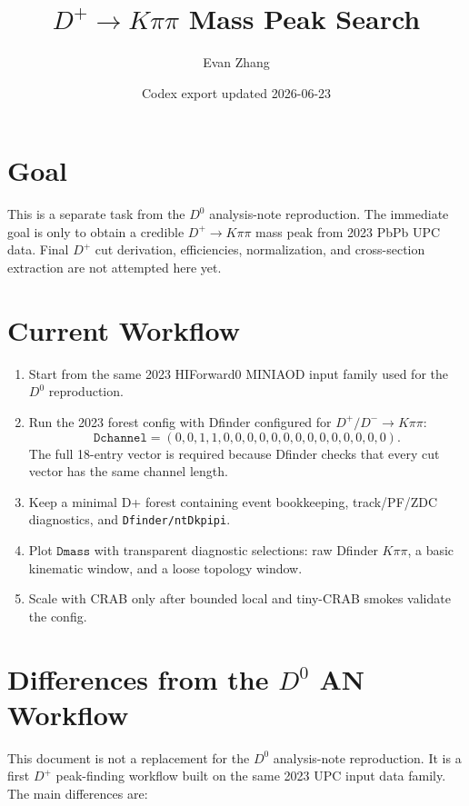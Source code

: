 \documentclass[10pt]{article}
\title{\texorpdfstring{\(D^+ \to K\pi\pi\) Mass Peak Search}{D+ to Kpipi Mass Peak Search}}
\author{Evan Zhang}
\date{Codex export updated 2026-06-23}
\begin{document}
\maketitle
\vspace{-1.2em}

\section*{Goal}

This is a separate task from the \(D^0\) analysis-note reproduction. The
immediate goal is only to obtain a credible \(D^+ \to K\pi\pi\) mass peak from
2023 PbPb UPC data. Final \(D^+\) cut derivation, efficiencies, normalization,
and cross-section extraction are not attempted here yet.

\section*{Current Workflow}

\begin{enumerate}
\item Start from the same 2023 HIForward0 MINIAOD input family used for the
\(D^0\) reproduction.
\item Run the 2023 forest config with Dfinder configured for
\(D^+/D^- \to K\pi\pi\):
\[
\texttt{Dchannel} =
(0,0,1,1,0,0,0,0,0,0,0,0,0,0,0,0,0,0).
\]
The full 18-entry vector is required because Dfinder checks that every cut
vector has the same channel length.
\item Keep a minimal D+ forest containing event bookkeeping, track/PF/ZDC
diagnostics, and \texttt{Dfinder/ntDkpipi}.
\item Plot \(\texttt{Dmass}\) with transparent diagnostic selections:
raw Dfinder \(K\pi\pi\), a basic kinematic window, and a loose topology
window.
\item Scale with CRAB only after bounded local and tiny-CRAB smokes validate
the config.
\end{enumerate}

\section*{Differences from the \(D^0\) AN Workflow}

This document is not a replacement for the \(D^0\) analysis-note reproduction.
It is a first \(D^+\) peak-finding workflow built on the same 2023 UPC input
data family. The main differences are:
\end{document}
